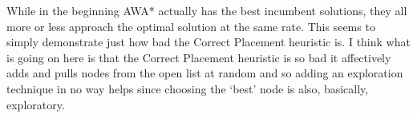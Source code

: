 While in the beginning AWA* actually has the best incumbent solutions, they all more or less approach the optimal solution at the same rate. This seems to simply demonstrate just how bad the Correct Placement heuristic is. I think what is going on here is that the Correct Placement heuristic is so bad it affectively adds and pulls nodes from the open list at random and so adding an exploration technique in no way helps since choosing the `best' node is also, basically, exploratory.


